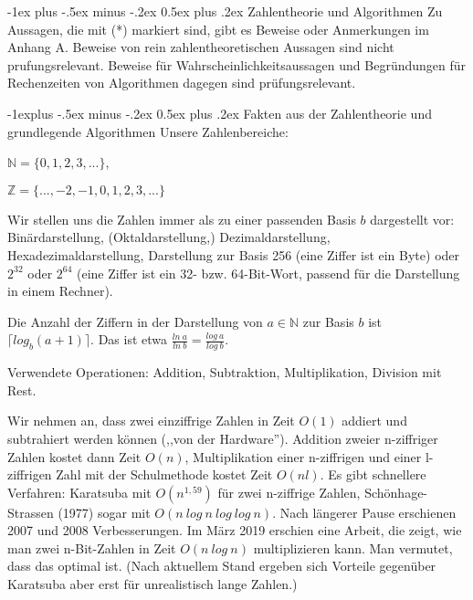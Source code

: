 \documentclass[a4paper]{article}
\makeatletter
\renewcommand{\section}{\@startsection{section}{1}{0mm}%
 {-1ex plus -.5ex minus -.2ex}%
 {0.5ex plus .2ex}%
 {\normalfont\large\bfseries}}
\renewcommand{\subsection}{\@startsection{subsection}{2}{0mm}%
 {-1explus -.5ex minus -.2ex}%
 {0.5ex plus .2ex}%
 {\normalfont\normalsize\bfseries}}
\makeatother
\begin{document}
\begin{multicols}{3}
    \section{Zahlentheorie und Algorithmen}
    Zu Aussagen, die mit (*) markiert sind, gibt es Beweise oder Anmerkungen im Anhang A. Beweise von rein zahlentheoretischen Aussagen sind nicht prufungsrelevant. Beweise für Wahrscheinlichkeitsaussagen und Begründungen für Rechenzeiten von Algorithmen dagegen sind prüfungsrelevant.

    \subsection{Fakten aus der Zahlentheorie und grundlegende Algorithmen}
    Unsere Zahlenbereiche:
    \begin{itemize*}
        \item $\mathbb{N}=\{ 0 , 1 , 2 , 3 ,...\}$,
        \item $\mathbb{Z}=\{...,- 2 ,- 1 , 0 , 1 , 2 , 3 ,...\}$
    \end{itemize*}

    Wir stellen uns die Zahlen immer als zu einer passenden Basis $b$ dargestellt vor: Binärdarstellung, (Oktaldarstellung,) Dezimaldarstellung, Hexadezimaldarstellung, Darstellung zur Basis 256 (eine Ziffer ist ein Byte) oder $2^{32}$ oder $2^{64}$ (eine Ziffer ist ein 32- bzw. 64-Bit-Wort, passend für die Darstellung in einem Rechner).

    Die Anzahl der Ziffern in der Darstellung von $a\in\mathbb{N}$ zur Basis $b$ ist $\lceil  log_b(a+1)\rceil$. Das ist etwa $\frac{ln\ a}{ln\ b}=\frac{log\ a}{log\ b}$.

    Verwendete Operationen: Addition, Subtraktion, Multiplikation, Division mit Rest.

    Wir nehmen an, dass zwei einziffrige Zahlen in Zeit $O(1)$ addiert und subtrahiert werden können (,,von der Hardware''). Addition zweier n-ziffriger Zahlen kostet dann Zeit $O(n)$, Multiplikation einer n-ziffrigen und einer l-ziffrigen Zahl mit der Schulmethode kostet Zeit $O(nl)$. Es gibt schnellere Verfahren: Karatsuba mit $O(n^{1,59})$ für zwei n-ziffrige Zahlen, Schönhage-Strassen (1977) sogar mit $O(n\ log\ n\ log\ log\ n)$. Nach längerer Pause erschienen 2007 und 2008 Verbesserungen. Im März 2019 erschien eine Arbeit, die zeigt, wie man zwei n-Bit-Zahlen in Zeit $O(n\ log\ n)$ multiplizieren kann. Man vermutet, dass das optimal ist. (Nach aktuellem Stand ergeben sich Vorteile gegenüber Karatsuba aber erst für unrealistisch lange Zahlen.)


\end{multicols}
\end{document}
